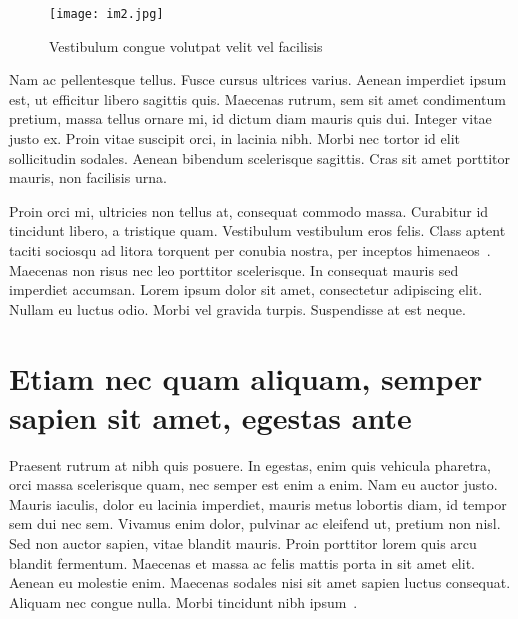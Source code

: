 \begin{figure}[H]
	\begin{center}
		\texttt{[image: im2.jpg]}
		\caption{Vestibulum congue volutpat velit vel facilisis}
		\label{fig:my_label2}
	\end{center}
\end{figure}

Nam ac pellentesque tellus. Fusce cursus ultrices varius. Aenean imperdiet ipsum est, ut efficitur libero sagittis quis. Maecenas rutrum, sem sit amet condimentum pretium, massa tellus ornare mi, id dictum diam mauris quis dui. Integer vitae justo ex. Proin vitae suscipit orci, in lacinia nibh. Morbi nec tortor id elit sollicitudin sodales. Aenean bibendum scelerisque sagittis. Cras sit amet porttitor mauris, non facilisis urna.

Proin orci mi, ultricies non tellus at, consequat commodo massa. Curabitur id tincidunt libero, a tristique quam. Vestibulum vestibulum eros felis. Class aptent taciti sociosqu ad litora torquent per conubia nostra, per inceptos himenaeos~\cite{Methodology}. Maecenas non risus nec leo porttitor scelerisque. In consequat mauris sed imperdiet accumsan. Lorem ipsum dolor sit amet, consectetur adipiscing elit. Nullam eu luctus odio. Morbi vel gravida turpis. Suspendisse at est neque.
\section{Etiam nec quam aliquam, semper sapien sit amet, egestas ante}
Praesent rutrum at nibh quis posuere. In egestas, enim quis vehicula pharetra, orci massa scelerisque quam, nec semper est enim a enim. Nam eu auctor justo. Mauris iaculis, dolor eu lacinia imperdiet, mauris metus lobortis diam, id tempor sem dui nec sem. Vivamus enim dolor, pulvinar ac eleifend ut, pretium non nisl. Sed non auctor sapien, vitae blandit mauris. Proin porttitor lorem quis arcu blandit fermentum. Maecenas et massa ac felis mattis porta in sit amet elit. Aenean eu molestie enim. Maecenas sodales nisi sit amet sapien luctus consequat. Aliquam nec congue nulla. Morbi tincidunt nibh ipsum~\cite{Nasirova}.
